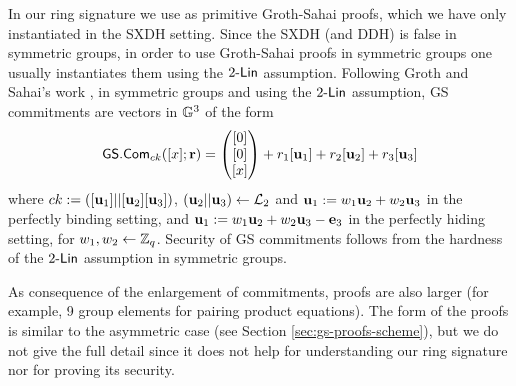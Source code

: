 In our ring signature we use as primitive Groth-Sahai proofs, which we have only instantiated in the SXDH setting. Since the SXDH (and DDH) is false in symmetric groups, in order to use Groth-Sahai proofs in symmetric groups one usually instantiates them using the $2\mbox{-}\mathsf{Lin}$ assumption. Following Groth and Sahai's work \cite{EC:GroSah08}, in symmetric groups and using the $2\mbox{-}\mathsf{Lin}$ assumption, GS commitments are vectors in $\mathbb{G}^3$ of the form
$$
{\mathsf{GS}}.\mathsf{Com}_{ck}([x];\mathbf{r})=\left(\begin{matrix}{[0]}\\{[0]}\\{[x]}\end{matrix}\right)+r_1[\mathbf{u}_1]+{r}_2[\mathbf{u}_2]+r_3[\mathbf{u}_3]
$$
where $ck:=([\mathbf{u}_1]||[\mathbf{u}_2][\mathbf{u}_3])$, $(\mathbf{u}_2||\mathbf{u}_3)\gets\mathcal{L}_2$ and $\mathbf{u}_1:=w_1\mathbf{u}_2+w_2\mathbf{u}_3$ in the perfectly binding setting, and $\mathbf{u}_1:=w_1\mathbf{u}_2+w_2\mathbf{u}_3-\mathbf{e}_3$ in the perfectly hiding setting, for $w_1,w_2\gets\mathbb{Z}_q$. Security of GS commitments follows from the hardness of the $2\mbox{-}\mathsf{Lin}$ assumption in symmetric groups.

As consequence of the enlargement of commitments, proofs are also larger (for example, 9 group elements for pairing product equations). The form of the proofs is similar  to the asymmetric case (see Section \ref{sec:gs-proofs-scheme}), but we do not give the full detail since it does not help for understanding our ring signature nor for proving its security. 


